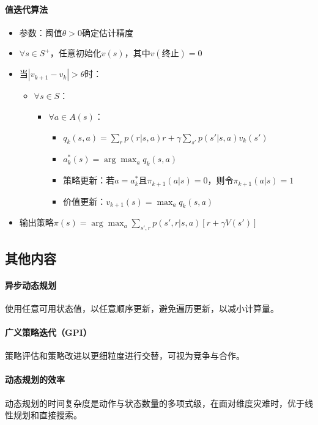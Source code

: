 \documentclass[
12pt, %
a4paper, 
oneside, %
headinclude,footinclude, %
]{scrartcl}
\begin{document}
\paragraph{值迭代算法}
\begin{itemize}
\item 参数：阈值$ \theta > 0 $确定估计精度
\item $ \forall s \in S^+ $，任意初始化$ v(s) $，其中$ v(\text{终止}) = 0 $
\item 当$ |v_{k + 1} - v_k| > \theta $时：
\begin{itemize}
\item $ \forall s \in S $：
\begin{itemize}
\item $ \forall a \in A(s) $：
\begin{itemize}
\item $ q_k(s, a) = \sum_r p(r|s, a)r + \gamma \sum_{s'} p(s'|s, a)v_k(s') $
\item $ a^*_k(s) = \arg\max_a q_k(s, a) $
\item 策略更新：若$ a = a^*_k $且$ \pi_{k + 1}(a|s) = 0 $，则令$ \pi_{k + 1}(a|s) = 1 $
\item 价值更新：$ v_{k + 1}(s) = \max_a q_k(s, a) $
\end{itemize}
\end{itemize}
\end{itemize}
\item 输出策略$ \pi(s) = \arg\max_a \sum_{s',r}p(s',r|s,a)[r + \gamma V(s')] $
\end{itemize}
\subsection{其他内容}
\paragraph{异步动态规划}
使用任意可用状态值，以任意顺序更新，避免遍历更新，以减小计算量。
\paragraph{广义策略迭代（GPI）}
策略评估和策略改进以更细粒度进行交替，可视为竞争与合作。
\paragraph{动态规划的效率}
动态规划的时间复杂度是动作与状态数量的多项式级，在面对维度灾难时，优于线性规划和直接搜索。
\end{document}
